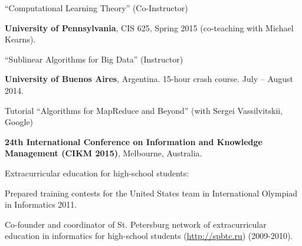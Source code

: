 \documentclass[11pt]{article}
\newenvironment{innerlist}[1][\enskip\textbullet]%
        {\begin{compactitem}[#1]}{\end{compactitem}}
\newcommand{\blankline}{\quad\pagebreak[2]}
\begin{document}
``Computational Learning Theory'' (Co-Instructor)
\begin{innerlist}
	\item \textbf{University of Pennsylvania}, CIS 625, Spring 2015 (co-teaching with Michael Kearns).
\end{innerlist}

``Sublinear Algorithms for Big Data'' (Instructor)
\begin{innerlist}
	\item \textbf{University of Buenos Aires}, Argentina. 15-hour crash course. July -- August 2014.
\end{innerlist}

\blankline

Tutorial ``Algorithms for MapReduce and Beyond'' (with Sergei Vassilvitskii, Google) 
\begin{innerlist}
	\item \textbf{24th International Conference on Information and Knowledge Management (CIKM 2015)}, Melbourne, Australia.
\end{innerlist}

\blankline

Extracurricular education for high-school students:

\begin{innerlist}
	\item Prepared training contests for the United States team in International Olympiad in Informatics 2011.
	
	\item Co-founder and coordinator of St. Petersburg network of extracurricular education in informatics for high-school students (\href{http://spbtc.ru}{http://spbtc.ru}) (2009-2010).
	
	
\end{innerlist}
\end{document}
